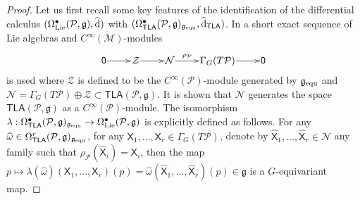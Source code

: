\documentclass[number]{elsarticle}
\theoremstyle{definition}
\theoremstyle{remark}
\numberwithin{equation}{section}
\begin{document}
\begin{proof}
Let us first recall some key features of the identification of the differential calculus $(\Omega^{\bullet}_{{\text{\textup{Lie}}}}({{{{\mathcal{{P}}}}}}, {{\mathfrak g}}), {\widehat{\text{\textup{d}}}})$ with $(\Omega^{\bullet}_{{{{\mathbf{\mathsf{{TLA}}}}}}}({{{{\mathcal{{P}}}}}},{{\mathfrak g}})_{{{\mathfrak g}}_{{\text{\textup{equ}}}}}, {\widehat{\text{\textup{d}}}}_{{{{\mathbf{\mathsf{{TLA}}}}}}})$. In \cite{Mass38} a short exact sequence of Lie algebras and $C^\infty({{{{\mathcal{{M}}}}}})$-modules
\begin{equation*}
\xymatrix@1{{{{{\mathsf{{0}}}}}} \ar[r] & {{\mathcal Z}} \ar[r] & {{\mathcal N}} \ar[r]^-{\rho_{{{{\mathcal{{P}}}}}}} & {\Gamma_G(T{{{{\mathcal{{P}}}}}})} \ar[r] & {{{{\mathsf{{0}}}}}}}
\end{equation*}
is used where ${{\mathcal Z}}$ is defined to be the $C^\infty({{{{\mathcal{{P}}}}}})$-module generated by ${{\mathfrak g}}_{{\text{\textup{equ}}}}$ and ${{\mathcal N}} = \Gamma_G(T{{{{\mathcal{{P}}}}}}) \oplus {{\mathcal Z}} \subset {{{{\mathbf{\mathsf{{TLA}}}}}}}({{{{\mathcal{{P}}}}}}, {{\mathfrak g}})$. It is shown that ${{\mathcal N}}$ generates the space ${{{{\mathbf{\mathsf{{TLA}}}}}}}({{{{\mathcal{{P}}}}}}, {{\mathfrak g}})$ as a $C^\infty({{{{\mathcal{{P}}}}}})$-module.
The isomorphism $\lambda : \Omega^{\bullet}_{{{{\mathbf{\mathsf{{TLA}}}}}}}({{{{\mathcal{{P}}}}}},{{\mathfrak g}})_{{{\mathfrak g}}_{{\text{\textup{equ}}}}} \rightarrow \Omega^{\bullet}_{{\text{\textup{Lie}}}}({{{{\mathcal{{P}}}}}}, {{\mathfrak g}})$ is explicitly defined as follows. For any ${\widehat{\omega}} \in \Omega^r_{{{{\mathbf{\mathsf{{TLA}}}}}}}({{{{\mathcal{{P}}}}}},{{\mathfrak g}})_{{{\mathfrak g}}_{{\text{\textup{equ}}}}}$, for any ${{\mathsf X}}_1, \dots, {{\mathsf X}}_r \in \Gamma_G(T{{{{\mathcal{{P}}}}}})$, denote by ${{\widehat{\mathsf{X}}}}_1, \dots, {{\widehat{\mathsf{X}}}}_r \in {{\mathcal N}}$ any family such that $\rho_{{{{\mathcal{{P}}}}}}({{\widehat{\mathsf{X}}}}_i) = {{\mathsf X}}_i$, then the map $p \mapsto \lambda({\widehat{\omega}})({{\mathsf X}}_1, \dots, {{\mathsf X}}_r)(p) = {\widehat{\omega}}({{\widehat{\mathsf{X}}}}_1, \dots, {{\widehat{\mathsf{X}}}}_r)(p) \in {{\mathfrak g}}$ is a $G$-equivariant map.


\end{proof}
\end{document}
